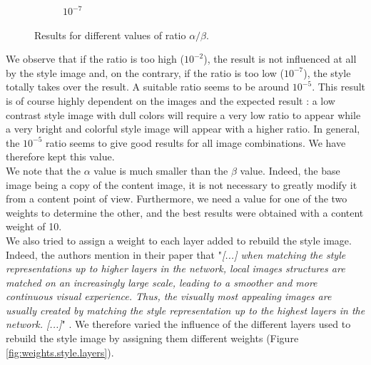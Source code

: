 \documentclass[twocolumn,superscriptaddress,aps,floatfix, nofootinbib]{revtex4-1}
\begin{document}
\begin{figure}[ht]
\begin{subfigure}[b]{0.13\textwidth}
            \caption{$10^{-7}$}
        \end{subfigure}
        \caption{Results for different values of ratio $\alpha/\beta$.}
        \label{fig:weights.ratio}
    \end{figure}
    
    We observe that if the ratio is too high ($10^{-2}$), the result is not influenced at all by the style image and, on the contrary, if the ratio is too low ($10^{-7}$), the style totally takes over the result. A suitable ratio seems to be around $10^{-5}$. This result is of course highly dependent on the images and the expected result : a low contrast style image with dull colors will require a very low ratio to appear while a very bright and colorful style image will appear with a higher ratio. In general, the $10^{-5}$ ratio seems to give good results for all image combinations. We have therefore kept this value.\\
    
    We note that the $\alpha$ value is much smaller than the $\beta$ value. Indeed, the base image being a copy of the content image, it is not necessary to greatly modify it from a content point of view. Furthermore, we need a value for one of the two weights to determine the other, and the best results were obtained with a content weight of 10.\\
    
    We also tried to assign a weight to each layer added to rebuild the style image. Indeed, the authors mention in their paper that "\emph{[...] when matching the style representations up to higher layers in the network, local images structures are matched on an increasingly large scale, leading to a smoother and more continuous visual experience. Thus, the visually most appealing images are usually created by matching the style representation up to the highest layers in the network. [...]}" \cite{DBLP:journals/corr/GatysEB15a}. We therefore varied the influence of the different layers used to rebuild the style image by assigning them different weights (Figure \ref{fig:weights.style.layers}).
\end{document}
